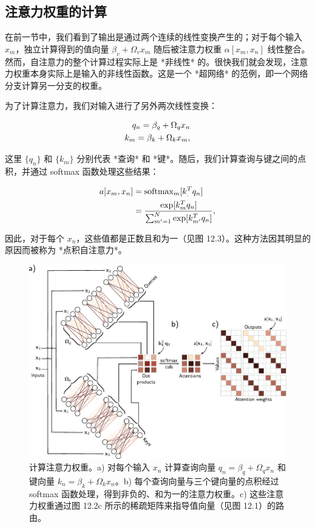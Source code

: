 \documentclass[lang=cn,newtx,10pt,scheme=chinese]{elegantbook}
\begin{document}
\subsection{注意力权重的计算}
在前一节中，我们看到了输出是通过两个连续的线性变换产生的；对于每个输入 \(x_m\)，独立计算得到的值向量 \(\beta_v + \Omega_vx_m\) 随后被注意力权重 \(\alpha[x_m, x_n]\) 线性整合。然而，自注意力的整个计算过程实际上是 *非线性* 的。很快我们就会发现，注意力权重本身实际上是输入的非线性函数。这是一个 *超网络* 的范例，即一个网络分支计算另一分支的权重。

为了计算注意力，我们对输入进行了另外两次线性变换：


\begin{align}
q_n = \beta_q + \Omega_qx_n \notag \\
k_m = \beta_k + \Omega_kx_m, 
\end{align}


这里 \(\{q_n\}\) 和 \(\{k_m\}\) 分别代表 *查询* 和 *键*。随后，我们计算查询与键之间的点积，并通过 softmax 函数处理这些结果：


\begin{align}
a[x_m, x_n] &= \text{softmax}_{m} [k_.^T q_n] \notag \\
&= \frac{\exp[k_m^T q_n]}{\sum_{m'=1}^N \exp[k_{m'}^T q_n]}, 
\end{align} 

因此，对于每个 \(x_n\)，这些值都是正数且和为一（见图 12.3）。这种方法因其明显的原因而被称为 *点积自注意力*。

\begin{figure}[ht!]
\centering
\includegraphics[width=0.7\linewidth]{PDFFigures/UDLChap12PDF/TransformerSA2.pdf}
\caption{计算注意力权重。a) 对每个输入 \(x_n\) 计算查询向量 \(q_n = \beta_q + \Omega_qx_n\) 和键向量 \(k_n = \beta_k + \Omega_kx_n\)。b) 每个查询向量与三个键向量的点积经过 softmax 函数处理，得到非负的、和为一的注意力权重。c) 这些注意力权重通过图 12.2c 所示的稀疏矩阵来指导值向量（见图 12.1）的路由。}
\end{figure}
\end{document}
